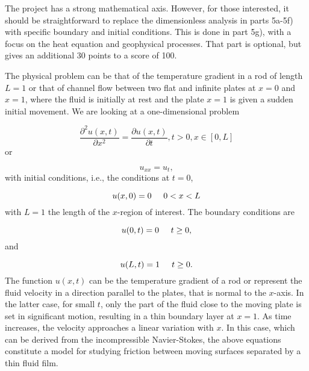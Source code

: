 \documentclass[%
oneside,                 %
final,                   %
10pt]{article}
\begin{document}
The project has a strong mathematical axis. However, for those interested, it should be straightforward to replace the dimensionless analysis in  parts 5a-5f) with specific boundary and initial conditions. This is done in part 5g), with a focus on the heat equation and geophysical processes. That part is optional, but gives an additional 30 points to a score of 100.

The physical problem can be that of the temperature gradient in a rod of length $L=1$ or that of channel flow
between two flat and infinite plates at $x=0$ and $x=1$, where the fluid is initially at rest
and the plate $x=1$ is given a sudden initial movement.  We are looking at a one-dimensional
problem

\begin{equation*}
 \frac{\partial^2 u(x,t)}{\partial x^2} =\frac{\partial u(x,t)}{\partial t}, t> 0, x\in [0,L]
\end{equation*}
or

\begin{equation*}
u_{xx} = u_t,
\end{equation*}
with initial conditions, i.e., the conditions at $t=0$,

\begin{equation*}
u(x,0)= 0 \hspace{0.5cm} 0 < x < L
\end{equation*}
with $L=1$ the length of the $x$-region of interest. The 
boundary conditions are

\begin{equation*}
u(0,t)= 0 \hspace{0.5cm} t \ge 0,
\end{equation*}
and

\begin{equation*}
u(L,t)= 1 \hspace{0.5cm} t \ge 0.
\end{equation*}
The function $u(x,t)$  can be the temperature gradient of a  rod or represent the fluid velocity 
in a direction parallel to the plates, that is normal to the $x$-axis. In the latter case, 
for small $t$, only the part of the fluid
close to the moving plate is set in significant  motion, resulting in a thin boundary layer at $x=1$. 
As time increases, the velocity approaches a linear variation with $x$. In this case, which can be derived
from the incompressible Navier-Stokes, the above equations constitute a model for  
studying friction between moving surfaces separated by a thin fluid film.
\end{document}

